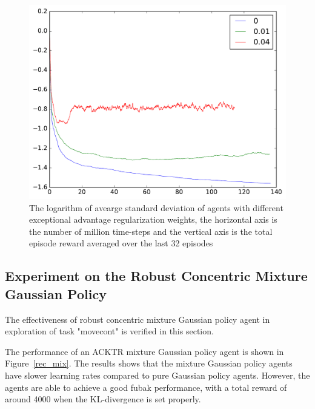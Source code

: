 \begin{figure}[!htbp]
	\includegraphics[width=\textwidth]{images/rec_std_adv_reg.pdf}
	\centering
	\caption{The logarithm of avearge standard deviation of agents with different exceptional advantage regularization weights, the horizontal axis is the number of million time-steps and the vertical axis is the total episode reward averaged over the last 32 episodes}\label{rec_std_adv_reg}
\end{figure}

\subsection{Experiment on the Robust Concentric Mixture Gaussian Policy}
The effectiveness of robust concentric mixture Gaussian policy agent in exploration of task "movecont" is verified in this section. 

The performance of an ACKTR mixture Gaussian policy agent is shown in Figure~\ref{rec_mix}. The results shows that the mixture Gaussian policy agents have slower learning rates compared to pure Gaussian policy agents. However, the agents are able to achieve a good fubak performance, with a total reward of around 4000 when the KL-divergence is set properly.

